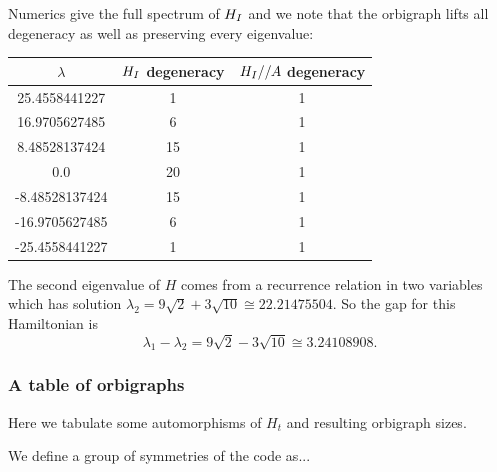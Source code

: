 \documentclass[12pt]{article}
\begin{document}

Numerics give the full spectrum of $H_I$ and we note that the orbigraph lifts
all degeneracy as well as preserving every eigenvalue:
\begin{center}
\begin{tabular}{ c|c|c } 
$\lambda$ & $H_I$ degeneracy & $H_I//A$ degeneracy \\
\hline
    25.4558441227 & 1 & 1 \\
    16.9705627485 & 6 & 1 \\
    8.48528137424 & 15 & 1 \\
    0.0 & 20 & 1 \\
    -8.48528137424 & 15 & 1 \\
    -16.9705627485 & 6 & 1 \\
    -25.4558441227 & 1 & 1 \\
\end{tabular}
\end{center}

The second eigenvalue of $H$ comes from a recurrence
relation in two variables which has solution
$\lambda_2 = 9\sqrt{2} + 3\sqrt{10} \cong 22.21475504.$
So the gap for this Hamiltonian  is 
$$\lambda_1 - \lambda_2 = 9\sqrt{2} - 3\sqrt{10} \cong 3.24108908.$$


%
\subsubsection{A table of orbigraphs}

Here we tabulate some automorphisms of $H_t$
and resulting orbigraph sizes.

We define a group of symmetries of the code as...
\end{document}
